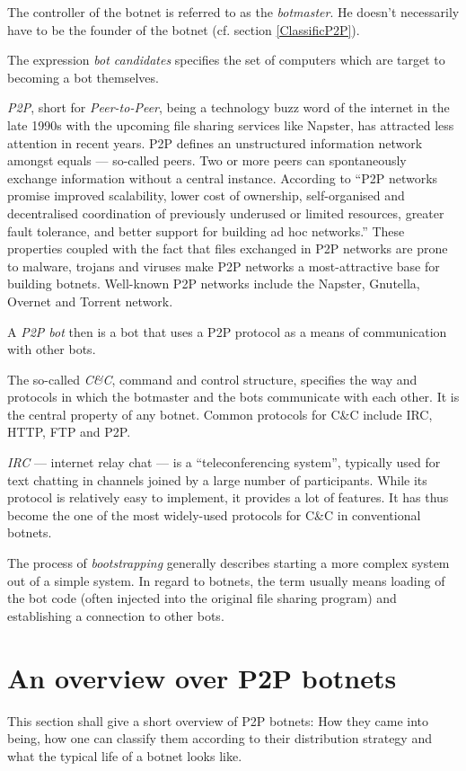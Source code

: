 \documentclass{llncs}
\begin{document}
The controller of the botnet is referred to as the {\it
  botmaster}. He doesn't necessarily have to be the founder of the
botnet (cf. section \ref{ClassificP2P}).

The expression {\it bot candidates} specifies the set of computers
which are target to becoming a bot themselves.

{\it P2P}, short for {\it Peer-to-Peer}, being a technology buzz word
of the internet in the late 1990s with the upcoming file sharing
services like Napster\cite{napster}, has attracted less attention in
recent years. P2P defines an unstructured information network amongst
equals --- so-called peers. Two or more peers can spontaneously
exchange information without a central instance. According to
\cite{schoder2005core} ``P2P networks promise improved scalability,
lower cost of ownership, self-organised and decentralised coordination
of previously underused or limited resources, greater fault tolerance,
and better support for building ad hoc networks.''  These properties
coupled with the fact that files exchanged in P2P networks are prone
to malware, trojans and viruses make P2P networks a most-attractive
base for building botnets.  Well-known P2P networks include the
Napster, Gnutella, Overnet and Torrent network.  

A {\it P2P bot} then is a bot that uses a P2P protocol as a means of
communication with other bots.

The so-called {\it C\&C}, command and control structure, specifies
the way and protocols in which the botmaster and the bots communicate
with each other. It is the central property of any botnet. Common
protocols for C\&C include IRC, HTTP, FTP and
P2P.\cite{borgaonkar2010analysis}

{\it IRC} --- internet relay chat --- is a ``teleconferencing
system''\cite{irc}, typically used for text chatting in channels
joined by a large number of participants. While its protocol is
relatively easy to implement, it provides a lot of features. It has
thus become the one of the most widely-used protocols for C\&C in
conventional botnets.

The process of {\it bootstrapping} generally describes starting a more
complex system out of a simple system. In regard to botnets, the
term usually means loading of the bot code (often injected into the
original file sharing program) and establishing a connection to other
bots.\cite{wang2009systematic}


\section{An overview over P2P botnets}
This section shall give a short overview of P2P botnets: How they came
into being, how one can classify them according to their distribution
strategy and what the typical life of a botnet looks like.
\end{document}

